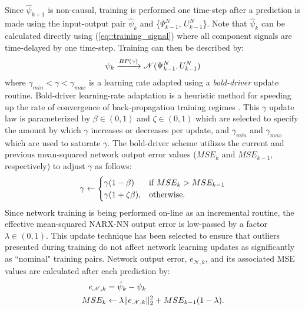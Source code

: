 Since $\hat{\psi}_{k+1}$ is non-causal, training is performed one time-step after a prediction is made using the input-output pair $\hat{\psi}_{k}$ and \{${\Psi}_{k-1}^{N}$, ${U}_{k-1}^{N}$\}. Note that $\hat{\psi}_{k}$ can be calculated directly using (\ref{eq::training_signal}) where all component signals are time-delayed by one time-step. Training can then be described by:
	\begin{equation}
		\vspace{-1mm}
		\psi_{k} \xrightarrow{BP(\gamma)} \mathscr{N}({\Psi}_{k-1}^{N},{U}_{k-1}^{N})
		\label{eq::training}
	\end{equation}
where $\gamma _{min} < \gamma < \gamma _{max}$ is a learning rate adapted using a \emph{bold-driver} update routine. Bold-driver learning-rate adaptation is a  heuristic method for speeding up the rate of convergence of back-propagation training regimes \cite{Battiti1992,Magoulas1999}. This $\gamma$ update law is parameterized by $\beta \in (0,1)$ and $\zeta \in (0,1)$ which are selected to specify the amount by which $\gamma$ increases or decreases per update, and $\gamma _{min}$ and $\gamma _{max}$ which are used to saturate $\gamma$.  The bold-driver scheme utilizes the current and previous mean-squared network output error values ($MSE_{k}$ and $MSE_{k-1}$, respectively) to adjust $\gamma$ as follows:
	\begin{equation}
		\vspace{-1mm}
	    \gamma \leftarrow 
		\begin{cases}
	    \gamma (1- \beta) 		& \text{if } MSE_{k} > MSE_{k-1}\\
	    \gamma (1+\zeta \beta),& \text{otherwise}.
		\end{cases}
	\end{equation}
Since network training is being performed on-line as an incremental routine, the effective mean-squared NARX-NN  output error is low-passed by a factor $\lambda \in (0,1)$. This update technique has been selected to ensure that outliers presented during training do not affect network learning updates as significantly as ``nominal" training pairs. Network output error, $e_{\mathscr{N},k}$, and its associated MSE values are calculated after each prediction by:
	\begin{equation}
		\vspace{-1mm}
		\begin{split}
		e_{\mathscr{N},k} 	&= \hat{\psi}_{k} - \psi_{k} \\
		MSE_{k} 			&\leftarrow \lambda \|e_{\mathscr{N},k}\|_{2}^{2} + MSE_{k-1}(1-\lambda).
		\end{split}
	\end{equation}


